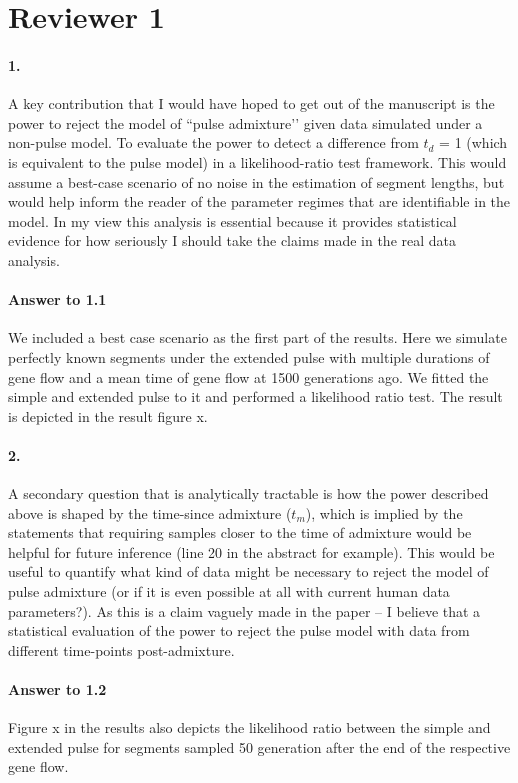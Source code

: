 \documentclass[11pt]{article}
\let\oldparagraph\paragraph
\renewcommand{\paragraph}[1]{\oldparagraph{#1}\mbox{}}
\begin{document}
\section{Reviewer 1}\label{Reviewer 1}

\paragraph{1.}
A key contribution that I would have hoped to get out of the manuscript is the power to reject the model of ``pulse admixture’’ given data simulated under a non-pulse model. To evaluate the power to detect a difference from $t_d$ = 1 (which is equivalent to the pulse model) in a likelihood-ratio test framework. This would assume a best-case scenario of no noise in the estimation of segment lengths, but would help inform the reader of the parameter regimes that are identifiable in the model. In my view this analysis is essential because it provides statistical evidence for how seriously I should take the claims made in the real data analysis.

\paragraph{Answer to 1.1}
We included a best case scenario as the first part of the results. Here we simulate perfectly known segments under the extended pulse with multiple durations of gene flow and a mean time of gene flow at 1500 generations ago. We fitted the simple and extended pulse to it and performed a likelihood ratio test. The result is depicted in the result figure x. 

\paragraph{2.}
A secondary question that is analytically tractable is how the power described above is shaped by the time-since admixture ($t_m$), which is implied by the statements that requiring samples closer to the time of admixture would be helpful for future inference (line 20 in the abstract for example). This would be useful to quantify what kind of data might be necessary to reject the model of pulse admixture (or if it is even possible at all with current human data parameters?). As this is a claim vaguely made in the paper – I believe that a statistical evaluation of the power to reject the pulse model with data from different time-points post-admixture. 

\paragraph{Answer to 1.2}
Figure x in the results also depicts the likelihood ratio between the simple and extended pulse for segments sampled 50 generation after the end of the respective gene flow. 
\end{document}
